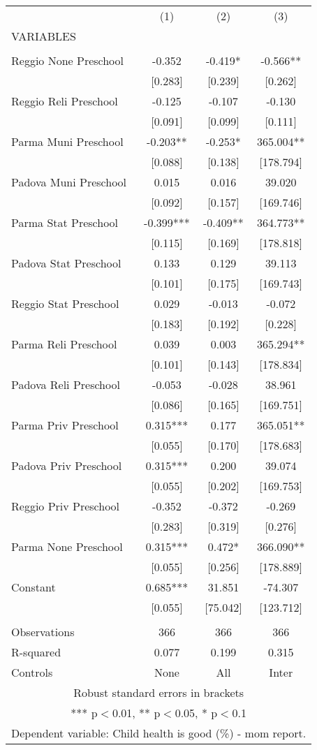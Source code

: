 \begin{tabular}{lccc} \hline
 & (1) & (2) & (3) \\
VARIABLES &  &  &  \\ \hline
 &  &  &  \\
Reggio None Preschool & -0.352 & -0.419* & -0.566** \\
 & [0.283] & [0.239] & [0.262] \\
Reggio Reli Preschool & -0.125 & -0.107 & -0.130 \\
 & [0.091] & [0.099] & [0.111] \\
Parma Muni Preschool & -0.203** & -0.253* & 365.004** \\
 & [0.088] & [0.138] & [178.794] \\
Padova Muni Preschool & 0.015 & 0.016 & 39.020 \\
 & [0.092] & [0.157] & [169.746] \\
Parma Stat Preschool & -0.399*** & -0.409** & 364.773** \\
 & [0.115] & [0.169] & [178.818] \\
Padova Stat Preschool & 0.133 & 0.129 & 39.113 \\
 & [0.101] & [0.175] & [169.743] \\
Reggio Stat Preschool & 0.029 & -0.013 & -0.072 \\
 & [0.183] & [0.192] & [0.228] \\
Parma Reli Preschool & 0.039 & 0.003 & 365.294** \\
 & [0.101] & [0.143] & [178.834] \\
Padova Reli Preschool & -0.053 & -0.028 & 38.961 \\
 & [0.086] & [0.165] & [169.751] \\
Parma Priv Preschool & 0.315*** & 0.177 & 365.051** \\
 & [0.055] & [0.170] & [178.683] \\
Padova Priv Preschool & 0.315*** & 0.200 & 39.074 \\
 & [0.055] & [0.202] & [169.753] \\
Reggio Priv Preschool & -0.352 & -0.372 & -0.269 \\
 & [0.283] & [0.319] & [0.276] \\
Parma None Preschool & 0.315*** & 0.472* & 366.090** \\
 & [0.055] & [0.256] & [178.889] \\
Constant & 0.685*** & 31.851 & -74.307 \\
 & [0.055] & [75.042] & [123.712] \\
 &  &  &  \\
Observations & 366 & 366 & 366 \\
R-squared & 0.077 & 0.199 & 0.315 \\
 Controls & None & All & Inter \\ \hline
\multicolumn{4}{c}{ Robust standard errors in brackets} \\
\multicolumn{4}{c}{ *** p$<$0.01, ** p$<$0.05, * p$<$0.1} \\
\multicolumn{4}{c}{ Dependent variable: Child health is good (\%) - mom report.} \\
\end{tabular}
